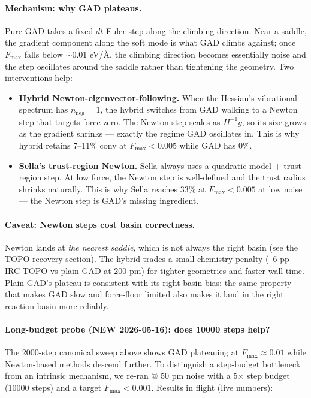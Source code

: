 \documentclass[11pt]{article}
\begin{document}
\paragraph{Mechanism: why GAD plateaus.} Pure GAD takes a fixed-$dt$ Euler
step along the climbing direction. Near a saddle, the gradient component
along the soft mode is what GAD climbs against; once $F_\mathrm{max}$ falls
below $\sim$0.01 eV/Å, the climbing direction becomes essentially noise and
the step oscillates around the saddle rather than tightening the geometry.
Two interventions help:

\begin{itemize}[leftmargin=1.5em, itemsep=0.05em]
\item \textbf{Hybrid Newton-eigenvector-following.} When the Hessian's
  vibrational spectrum has $n_\mathrm{neg}{=}1$, the hybrid switches from
  GAD walking to a Newton step that targets force-zero. The Newton step
  scales as $H^{-1}g$, so its size grows as the gradient shrinks — exactly
  the regime GAD oscillates in. This is why hybrid retains 7--11\% conv at
  $F_\mathrm{max}<0.005$ while GAD has 0\%.
\item \textbf{Sella's trust-region Newton.} Sella always uses a quadratic
  model + trust-region step. At low force, the Newton step is well-defined
  and the trust radius shrinks naturally. This is why Sella reaches 33\% at
  $F_\mathrm{max}<0.005$ at low noise — the Newton step is GAD's missing
  ingredient.
\end{itemize}

\paragraph{Caveat: Newton steps cost basin correctness.} Newton lands at
\emph{the nearest saddle}, which is not always the right basin (see the
TOPO recovery section). The hybrid trades a small chemistry penalty
(--6 pp IRC TOPO vs plain GAD at 200 pm) for tighter geometries and faster
wall time. Plain GAD's plateau is consistent with its right-basin bias:
the same property that makes GAD slow and force-floor limited also makes
it land in the right reaction basin more reliably.

\paragraph{Long-budget probe (NEW 2026-05-16): does 10000 steps help?}
The 2000-step canonical sweep above shows GAD plateauing at
$F_\mathrm{max}\approx 0.01$ while Newton-based methods descend further.
To distinguish a step-budget bottleneck from an intrinsic mechanism, we
re-ran @ 50 pm noise with a 5$\times$ step budget (10000 steps) and a
target $F_\mathrm{max}<0.001$. Results in flight (live numbers):
\end{document}
